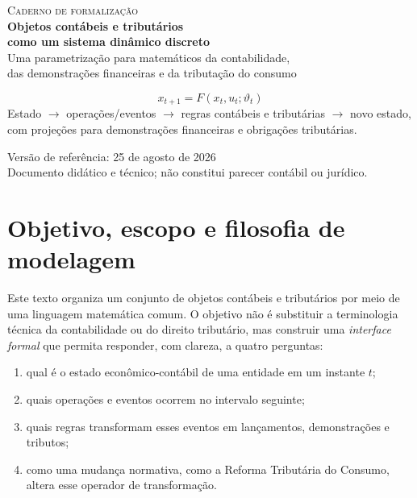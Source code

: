 \documentclass[11pt,a4paper]{article}
\begin{document}

\begin{titlepage}
\centering
\vspace*{1.3cm}
{\Large\color{Blue}\textsc{Caderno de formalização}}\\[0.55cm]
{\huge\bfseries\color{Navy}Objetos contábeis e tributários\\[0.18cm]
como um sistema dinâmico discreto}\\[0.65cm]
{\Large\color{Teal}Uma parametrização para matemáticos da contabilidade,\\
das demonstrações financeiras e da tributação do consumo}\\[1.3cm]

\begin{tcolorbox}[width=0.90\textwidth,colback=LightGray,colframe=MidGray,boxrule=0.5pt,arc=2mm]
\centering
\large
\[
\boxed{x_{t+1}=F(x_t,u_t;\vartheta_t)}
\]
\vspace{-1mm}
\small
Estado $\to$ operações/eventos $\to$ regras contábeis e tributárias $\to$ novo estado,\\
com projeções para demonstrações financeiras e obrigações tributárias.
\end{tcolorbox}

\vfill
{\large Versão de referência: 25 de agosto de 2026}\\[0.15cm]
{\small Documento didático e técnico; não constitui parecer contábil ou jurídico.}
\end{titlepage}

\tableofcontents
\clearpage
{}

\section{Objetivo, escopo e filosofia de modelagem}

Este texto organiza um conjunto de objetos contábeis e tributários por meio de uma linguagem matemática comum. O objetivo não é substituir a terminologia técnica da contabilidade ou do direito tributário, mas construir uma \emph{interface formal} que permita responder, com clareza, a quatro perguntas:

\begin{enumerate}
    \item qual é o estado econômico-contábil de uma entidade em um instante $t$;
    \item quais operações e eventos ocorrem no intervalo seguinte;
    \item quais regras transformam esses eventos em lançamentos, demonstrações e tributos;
    \item como uma mudança normativa, como a Reforma Tributária do Consumo, altera esse operador de transformação.
\end{enumerate}
\end{document}
